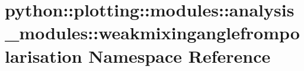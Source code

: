 \hypertarget{namespacepython_1_1plotting_1_1modules_1_1analysis__modules_1_1weakmixinganglefrompolarisation}{
\section{python::plotting::modules::analysis\_\-modules::weakmixinganglefrompolarisation Namespace Reference}
\label{namespacepython_1_1plotting_1_1modules_1_1analysis__modules_1_1weakmixinganglefrompolarisation}
}
